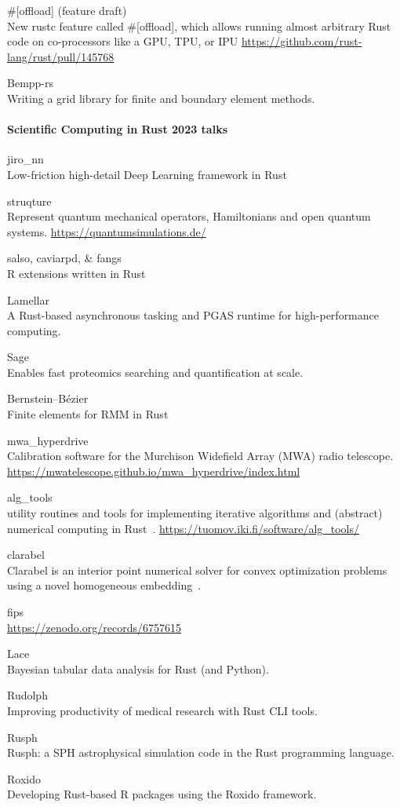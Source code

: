 \documentclass{article}
\begin{document}
\#[offload] (feature draft)\\
New rustc feature called \#[offload], which allows running almost arbitrary Rust code on
co-processors like a GPU, TPU, or IPU
\url{https://github.com/rust-lang/rust/pull/145768}

Bempp-rs\\
Writing a grid library for finite and boundary element methods. \cite{Witherden2015}

\paragraph{Scientific Computing in Rust 2023 talks}

jiro\_nn\\
Low-friction high-detail Deep Learning framework in Rust

struqture\\
Represent quantum mechanical operators, Hamiltonians and open quantum systems.
\url{https://quantumsimulations.de/}

salso, caviarpd, \& fangs\\
R extensions written in Rust

Lamellar\\
A Rust-based asynchronous tasking and PGAS runtime for high-performance computing.

Sage\\
Enables fast proteomics searching and quantification at scale.

Bernstein–Bézier\\
Finite elements for RMM in Rust~\cite{Sky2024}

mwa\_hyperdrive\\
Calibration software for the Murchison Widefield Array (MWA) radio telescope.
\url{https://mwatelescope.github.io/mwa_hyperdrive/index.html}

alg\_tools\\
utility routines and tools for implementing iterative algorithms and (abstract)
numerical computing in Rust~\cite{Valkonen2023}. \url{https://tuomov.iki.fi/software/alg_tools/}

clarabel\\
Clarabel is an interior point numerical solver for convex optimization problems using a
novel homogeneous embedding~\cite{Clarabel_2024}.

fips\\
\cite{jeggle2023genericframeworkdataracefreemanyparticle}
\url{https://zenodo.org/records/6757615}

Lace\\
Bayesian tabular data analysis for Rust (and Python).

Rudolph\\
Improving productivity of medical research with Rust CLI tools.

Rusph\\
Rusph: a SPH astrophysical simulation code in the Rust programming language.

Roxido\\
Developing Rust-based R packages using the Roxido framework.
\end{document}
